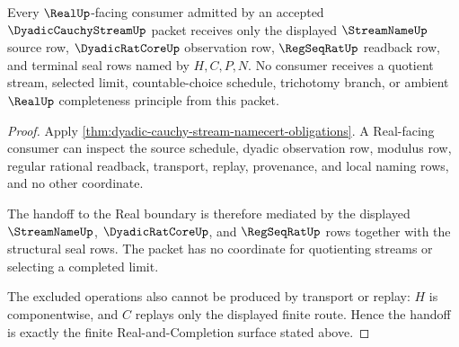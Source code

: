 \begin{theorem}
\label{thm:dyadic-cauchy-stream-real-handoff}
Every $\RealUp$-facing consumer admitted by an accepted $\DyadicCauchyStreamUp$ packet receives only the displayed $\StreamNameUp$ source row, $\DyadicRatCoreUp$ observation row, $\RegSeqRatUp$ readback row, and terminal seal rows named by $H,C,P,N$. No consumer receives a quotient stream, selected limit, countable-choice schedule, trichotomy branch, or ambient $\RealUp$ completeness principle from this packet.
\end{theorem}
\begin{proof}
Apply \autoref{thm:dyadic-cauchy-stream-namecert-obligations}. A Real-facing consumer can inspect the source schedule, dyadic observation row, modulus row, regular rational readback, transport, replay, provenance, and local naming rows, and no other coordinate.

The handoff to the Real boundary is therefore mediated by the displayed $\StreamNameUp$, $\DyadicRatCoreUp$, and $\RegSeqRatUp$ rows together with the structural seal rows. The packet has no coordinate for quotienting streams or selecting a completed limit.

The excluded operations also cannot be produced by transport or replay: $H$ is componentwise, and $C$ replays only the displayed finite route. Hence the handoff is exactly the finite Real-and-Completion surface stated above.
\end{proof}


\begin{closurestatus}{\DyadicCauchyStreamUp}
  \theoryclosure{\seedClosure}
  \formalstatus{\unformalizedV}
\end{closurestatus}

